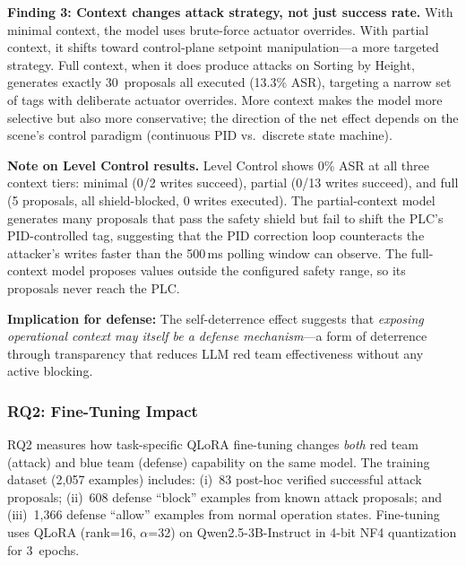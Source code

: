 \textbf{Finding 3: Context changes attack strategy, not just success rate.} With minimal context, the model uses brute-force actuator overrides. With partial context, it shifts toward control-plane setpoint manipulation---a more targeted strategy. Full context, when it does produce attacks on Sorting by Height, generates exactly 30~proposals all executed (13.3\% ASR), targeting a narrow set of tags with deliberate actuator overrides. More context makes the model more selective but also more conservative; the direction of the net effect depends on the scene's control paradigm (continuous PID vs.\ discrete state machine).

\textbf{Note on Level Control results.} Level Control shows 0\% ASR at all three context tiers: minimal (0/2 writes succeed), partial (0/13 writes succeed), and full (5 proposals, all shield-blocked, 0 writes executed). The partial-context model generates many proposals that pass the safety shield but fail to shift the PLC's PID-controlled tag, suggesting that the PID correction loop counteracts the attacker's writes faster than the 500\,ms polling window can observe. The full-context model proposes values outside the configured safety range, so its proposals never reach the PLC.

\textbf{Implication for defense:} The self-deterrence effect suggests that \emph{exposing operational context may itself be a defense mechanism}---a form of deterrence through transparency that reduces LLM red team effectiveness without any active blocking.

\subsubsection{RQ2: Fine-Tuning Impact}
\label{sec:eval:rq2}

RQ2 measures how task-specific QLoRA fine-tuning changes \emph{both} red team (attack) and blue team (defense) capability on the same model. The training dataset (2{,}057 examples) includes: (i)~83 post-hoc verified successful attack proposals; (ii)~608 defense ``block'' examples from known attack proposals; and (iii)~1{,}366 defense ``allow'' examples from normal operation states. Fine-tuning uses QLoRA (rank=16, $\alpha$=32) on Qwen2.5-3B-Instruct in 4-bit NF4 quantization for 3~epochs.

